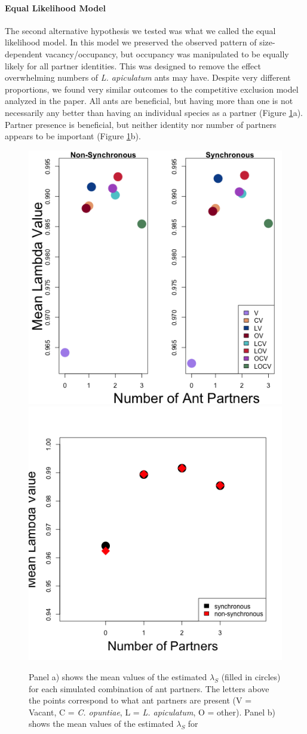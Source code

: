 \documentclass[11pt]{article}
\begin{document}
\paragraph{Equal Likelihood Model}
The second alternative hypothesis we tested was what we called the equal likelihood model.
In this model we preserved the observed pattern of size-dependent vacancy/occupancy, but occupancy was manipulated to be equally likely for all partner identities. 
This was designed to remove the effect overwhelming numbers of \textit{L. apiculatum} ants may have. 
Despite very different proportions, we found very similar outcomes to the competitive exclusion model analyzed in the paper. 
All ants are beneficial, but having more than one is not necessarily any better than having an individual species as a partner (Figure \ref{fig:BetweenLambdaMeans}a).
Partner presence is beneficial, but neither identity nor number of partners appears to be important (Figure \ref{fig:BetweenLambdaMeans}b).

\begin{figure}
\includegraphics[width=0.61\linewidth]{Figures/Lambdas_equal.png}
\includegraphics[width=0.39\linewidth]{Figures/equal_num_partners.png}
\caption{Panel a) shows the mean values of the estimated $\lambda_{S}$ (filled in circles) for each simulated combination of ant partners. The letters above the points correspond to what ant partners are present (V = Vacant, C = \textit{C. opuntiae}, L = \textit{L. apiculatum}, O = other). Panel b) shows the mean values of the estimated $\lambda_{S}$ for }
\label{fig:BetweenLambdaMeans}
\end{figure}
\end{document}
